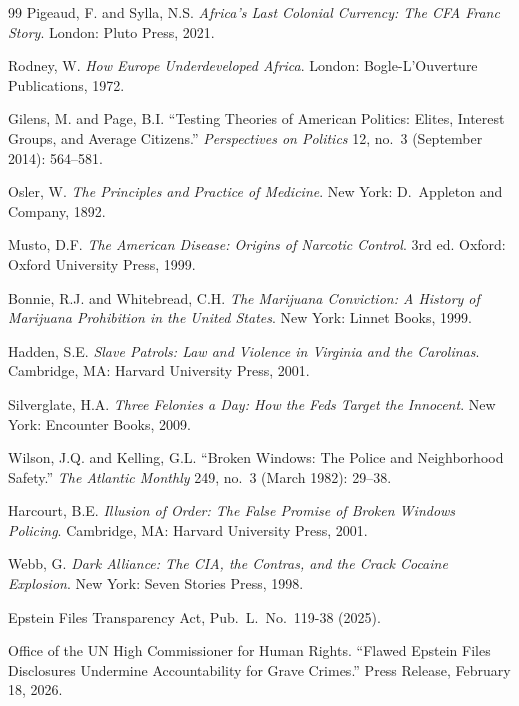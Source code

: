 \documentclass[12pt,openany]{book}
\begin{document}
\begin{thebibliography}{99}
Pigeaud, F. and Sylla, N.S. \textit{Africa's Last Colonial Currency: The CFA Franc Story}. London: Pluto Press, 2021.

Rodney, W. \textit{How Europe Underdeveloped Africa}. London: Bogle-L'Ouverture Publications, 1972.


Gilens, M. and Page, B.I. ``Testing Theories of American Politics: Elites, Interest Groups, and Average Citizens.'' \textit{Perspectives on Politics} 12, no.\ 3 (September 2014): 564--581.


Osler, W. \textit{The Principles and Practice of Medicine}. New York: D.\ Appleton and Company, 1892.

Musto, D.F. \textit{The American Disease: Origins of Narcotic Control}. 3rd ed. Oxford: Oxford University Press, 1999.

Bonnie, R.J. and Whitebread, C.H. \textit{The Marijuana Conviction: A History of Marijuana Prohibition in the United States}. New York: Linnet Books, 1999.


Hadden, S.E. \textit{Slave Patrols: Law and Violence in Virginia and the Carolinas}. Cambridge, MA: Harvard University Press, 2001.

Silverglate, H.A. \textit{Three Felonies a Day: How the Feds Target the Innocent}. New York: Encounter Books, 2009.

Wilson, J.Q. and Kelling, G.L. ``Broken Windows: The Police and Neighborhood Safety.'' \textit{The Atlantic Monthly} 249, no.\ 3 (March 1982): 29--38.

Harcourt, B.E. \textit{Illusion of Order: The False Promise of Broken Windows Policing}. Cambridge, MA: Harvard University Press, 2001.

Webb, G. \textit{Dark Alliance: The CIA, the Contras, and the Crack Cocaine Explosion}. New York: Seven Stories Press, 1998.


Epstein Files Transparency Act, Pub.\ L.\ No.\ 119-38 (2025).

Office of the UN High Commissioner for Human Rights. ``Flawed Epstein Files Disclosures Undermine Accountability for Grave Crimes.'' Press Release, February 18, 2026.


\end{thebibliography}
\end{document}
